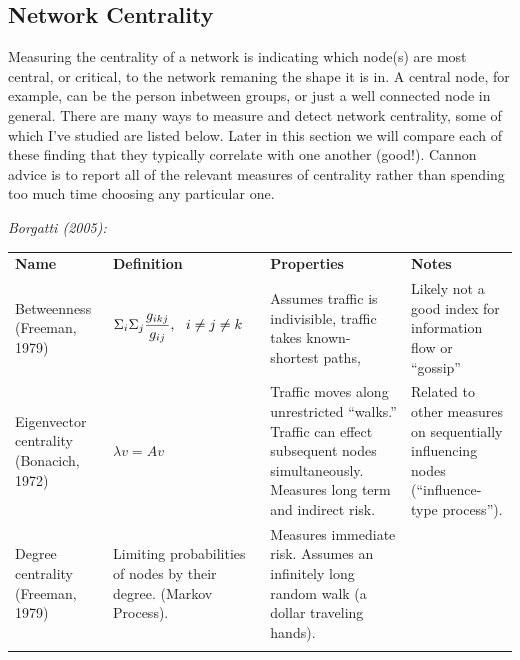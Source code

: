 \documentclass[12pt]{article}\usepackage[]{graphicx}\usepackage[]{color}
\begin{document}
\begin{flushleft}
\subsection{Network Centrality}

Measuring the centrality of a network is indicating which node(s) are most central, or critical, to the network remaning the shape it is in. A central node, for example, can be the person inbetween groups, or just a well connected node in general. There are many ways to measure and detect network centrality, some of which I've studied are listed below. Later in this section we will compare each of these finding that they typically correlate with one another (good!). Cannon advice is to report all of the relevant measures of centrality rather than spending too much time choosing any particular one.

\textit{Borgatti (2005):}
\begin{longtable}{m{2.8cm}  m{4cm} m{5.7cm} m{4.7cm}  }
\hline\noalign{\smallskip}
\textbf{Name} & \textbf{Definition} & \textbf{Properties} & \textbf{Notes} \\
\noalign{\smallskip}\hline\noalign{\smallskip}
Betweenness (Freeman, 1979) & $\mathlarger{ \Sigma_i \Sigma_j \frac{g_{ikj}}{g_{ij}}, ~~ i \neq j \neq k }$ & Assumes traffic is indivisible, traffic takes known-shortest paths,   & Likely not a good index for information flow or ``gossip'' \\
Eigenvector centrality (Bonacich, 1972) & $\lambda v = A v$ & Traffic moves along unrestricted ``walks.'' Traffic can effect subsequent nodes simultaneously. Measures long term and indirect risk.   & Related to other measures on sequentially influencing nodes (``influence-type process'').\\
Degree centrality (Freeman, 1979) & Limiting probabilities of nodes by their degree. (Markov Process).    & Measures immediate risk. Assumes an infinitely long random walk (a dollar traveling hands). \\
\noalign{\smallskip}\hline\noalign{\smallskip}
\end{longtable}



\end{flushleft}
\end{document}
